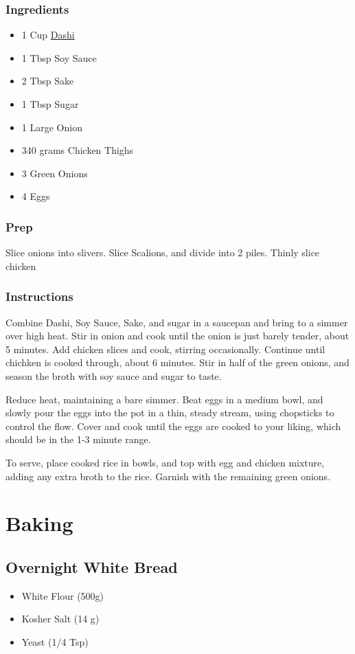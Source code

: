\documentclass[11pt]{article}
\begin{document}
\subsubsection{Ingredients}
\label{sec:orgb67a099}
\begin{itemize}
\item 1 Cup \hyperref[sec:org1e7046f]{Dashi}
\item 1 Tbsp Soy Sauce
\item 2 Tbsp Sake
\item 1 Tbsp Sugar
\item 1 Large Onion
\item 340 grams Chicken Thighs
\item 3 Green Onions
\item 4 Eggs
\end{itemize}
\subsubsection{Prep}
\label{sec:org1795e81}
Slice onions into slivers. Slice Scalions, and divide into 2 piles.
Thinly slice chicken
\subsubsection{Instructions}
\label{sec:org7d7e3fb}
Combine Dashi, Soy Sauce, Sake, and sugar in a saucepan and bring
to a simmer over high heat. Stir in onion and cook until the
onion is just barely tender, about 5 minutes. Add chicken slices
and cook, stirring occasionally. Continue until chichken is cooked
through, about 6 minutes. Stir in half of the green onions, and
season the broth with soy sauce and sugar to taste.

Reduce heat, maintaining a bare simmer. Beat eggs in a medium
bowl, and slowly pour the eggs into the pot in a thin, steady
stream, using chopsticks to control the flow. Cover and cook until
the eggs are cooked to your liking, which should be in the 1-3
minute range.

To serve, place cooked rice in bowls, and top with egg and chicken
mixture, adding any extra broth to the rice. Garnish with the
remaining green onions.
\section{Baking}
\label{sec:orgf8b2e15}
\subsection{Overnight White Bread}
\label{sec:orgd8daee8}
\begin{itemize}
\item White Flour (500g)
\item Kosher Salt (14 g)
\item Yeast (1/4 Tsp)
\end{itemize}
\end{document}
